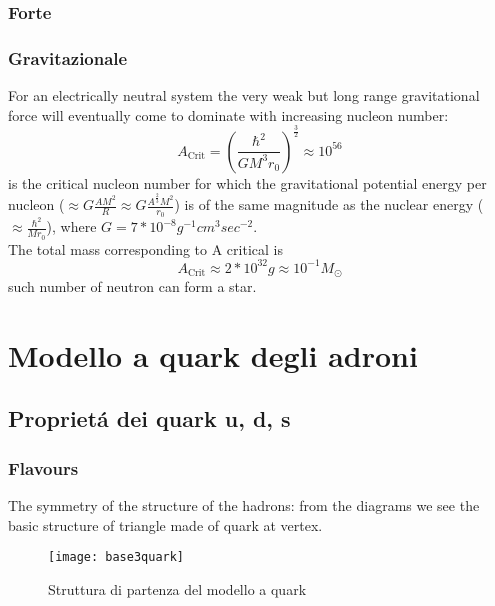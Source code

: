 \documentclass[main.tex]{subfiles}
\begin{document}
\subsection{Forte}

\subsection{Gravitazionale}
For an electrically neutral system the very weak but long range gravitational force will eventually come to dominate with increasing nucleon number:
\begin{equation*}
A_{\text{Crit}}=(\frac{\hbar^2}{GM^3r_0})^{\frac{3}{2}}\approx10^{56}
\end{equation*}
is the critical nucleon number for which the gravitational potential energy per nucleon ($\approx G\frac{AM^2}{R}\approx G\frac{A^{\frac{2}{3}}M^2}{r_0}$) is of the same magnitude as the nuclear energy ($\approx\frac{\hbar^2}{Mr_0}$), where $G=7*10^{-8}g^{-1}cm^3sec^{-2}$.\\

The total mass corresponding to A critical is
\begin{equation*}
A_{\text{Crit}}\approx2*10^{32}g\approx10^{-1}M_{\odot}
\end{equation*}
such number of neutron can form a star.

\chapter{Modello a quark degli adroni}

\section{Propriet\'a dei quark u, d, s}

\subsection{Flavours}


The symmetry of the structure of the hadrons: from the diagrams we see the basic structure of triangle made of quark \Pup\Pdown\Pqs at vertex.

\begin{figure}[!ht]
\centering
\texttt{[image: base3quark]}
\caption{Struttura di partenza del modello a quark}
\label{fig:base3quark}
\end{figure}
\end{document}
